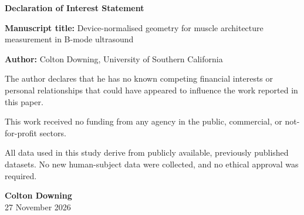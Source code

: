 \documentclass[11pt]{article}
\begin{document}
\begin{center}{\large\bfseries Declaration of Interest Statement}\end{center}
\vspace{1.5em}

\noindent\textbf{Manuscript title:} Device-normalised geometry for muscle architecture
measurement in B-mode ultrasound
\vspace{0.8em}

\noindent\textbf{Author:} Colton Downing, University of Southern California
\vspace{2em}

\noindent The author declares that he has no known competing financial interests or
personal relationships that could have appeared to influence the work reported in
this paper.
\vspace{1.5em}

\noindent This work received no funding from any agency in the public, commercial, or
not-for-profit sectors.
\vspace{1.5em}

\noindent All data used in this study derive from publicly available, previously published
datasets. No new human-subject data were collected, and no ethical approval was
required.
\vspace{3em}

\noindent\textbf{Colton Downing}\\
27 November 2026
\end{document}
